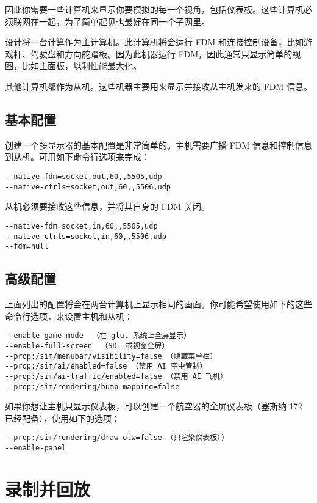 因此你需要一些计算机来显示你要模拟的每一个视角，包括仪表板。这些计算机必须联网在一起，为了简单起见也最好在同一个子网里。

设计将一台计算作为主计算机。此计算机将会运行 FDM 和连接控制设备，比如游戏杆、驾驶盘和方向舵踏板。因为此机器运行 FDM，因此通常只显示简单的视图，比如主面板，以利性能最大化。

其他计算机都作为从机。这些机器主要用来显示并接收从主机发来的 FDM 信息。

\subsection{基本配置}

创建一个多显示器的基本配置是非常简单的。主机需要广播 FDM 信息和控制信息到从机。可用如下命令行选项来完成：

\begin{verbatim}
--native-fdm=socket,out,60,,5505,udp
--native-ctrls=socket,out,60,,5506,udp
\end{verbatim}

从机必须要接收这些信息，并将其自身的 FDM 关闭。

\begin{verbatim}
--native-fdm=socket,in,60,,5505,udp
--native-ctrls=socket,in,60,,5506,udp
--fdm=null
\end{verbatim}

\subsection{高级配置}

上面列出的配置将会在两台计算机上显示相同的画面。你可能希望使用如下的这些命令行选项，来设置主机和从机：

\begin{verbatim}
--enable-game-mode  （在 glut 系统上全屏显示）
--enable-full-screen  （SDL 或视窗全屏）
--prop:/sim/menubar/visibility=false （隐藏菜单栏）
--prop:/sim/ai/enabled=false （禁用 AI 空中管制）
--prop:/sim/ai-traffic/enabled=false （禁用 AI 飞机）
--prop:/sim/rendering/bump-mapping=false
\end{verbatim}

如果你想让主机只显示仪表板，可以创建一个航空器的全屏仪表板（塞斯纳 172 已经配备），使用如下的选项：

\begin{verbatim}
--prop:/sim/rendering/draw-otw=false （只渲染仪表板）)
--enable-panel
\end{verbatim}

\section{录制并回放}

